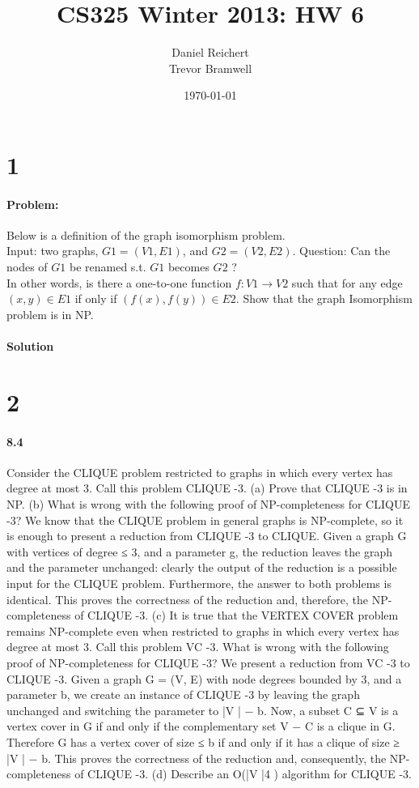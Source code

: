 \documentclass[12pt]{article}
\title{CS325 Winter 2013: HW 6}
\author{
    Daniel Reichert \\
    Trevor Bramwell \\
}
\date{\today}
\begin{document}
\maketitle
\section*{1}
\paragraph{Problem:}
Below is a definition of the graph isomorphism problem.\\
Input: two graphs, $G1 = (V1 , E1 )$, and $G2 = (V2 , E2 )$.
Question: Can the nodes of $G1$ be renamed s.t. $G1$ becomes $G2$ ?\\
In other words, is there a one-to-one function $f : V1 → V2$ such that for any edge $(x, y) ∈ E1$ if only if
$(f (x), f (y)) ∈ E2$. Show that the graph Isomorphism problem is in NP.

\paragraph{Solution}

\section*{2}
\paragraph{8.4}
Consider the CLIQUE problem restricted to graphs in which every vertex has degree at most 3.
Call this problem CLIQUE -3.
(a) Prove that
CLIQUE -3
is in NP.
(b) What is wrong with the following proof of NP-completeness for CLIQUE -3?
We know that the CLIQUE problem in general graphs is NP-complete, so it is enough to
present a reduction from CLIQUE -3 to CLIQUE. Given a graph G with vertices of degree ≤ 3,
and a parameter g, the reduction leaves the graph and the parameter unchanged: clearly
the output of the reduction is a possible input for the CLIQUE problem. Furthermore, the
answer to both problems is identical. This proves the correctness of the reduction and,
therefore, the NP-completeness of CLIQUE -3.
(c) It is true that the VERTEX COVER problem remains NP-complete even when restricted to
graphs in which every vertex has degree at most 3. Call this problem VC -3. What is wrong
with the following proof of NP-completeness for CLIQUE -3?
We present a reduction from VC -3 to CLIQUE -3. Given a graph G = (V, E) with node degrees
bounded by 3, and a parameter b, we create an instance of CLIQUE -3 by leaving the graph
unchanged and switching the parameter to |V | − b. Now, a subset C ⊆ V is a vertex cover
in G if and only if the complementary set V − C is a clique in G. Therefore G has a vertex
cover of size ≤ b if and only if it has a clique of size ≥ |V | − b. This proves the correctness of
the reduction and, consequently, the NP-completeness of CLIQUE -3.
(d) Describe an O(|V |4 ) algorithm for CLIQUE -3.
\end{document}
